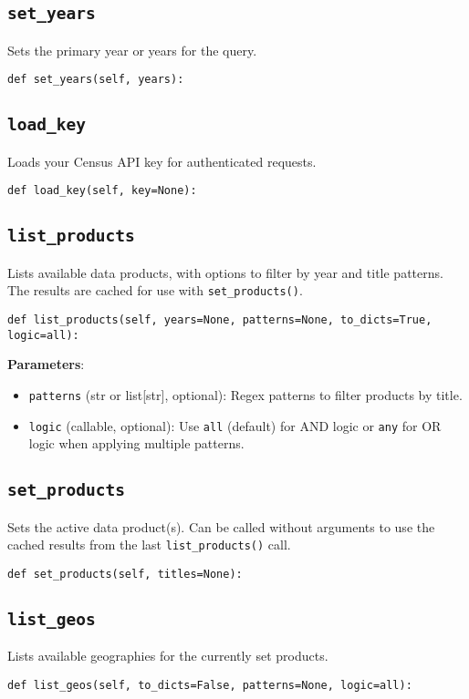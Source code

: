 \documentclass{article}
\begin{document}
\subsection{\texttt{set\_years}}
Sets the primary year or years for the query.
\begin{verbatim}
def set_years(self, years):
\end{verbatim}

\subsection{\texttt{load\_key}}
Loads your Census API key for authenticated requests.
\begin{verbatim}
def load_key(self, key=None):
\end{verbatim}

\subsection{\texttt{list\_products}}
Lists available data products, with options to filter by year and title patterns. The results are cached for use with \texttt{set\_products()}.
\begin{verbatim}
def list_products(self, years=None, patterns=None, to_dicts=True, logic=all):
\end{verbatim}
\textbf{Parameters}:
\begin{itemize}
    \item \texttt{patterns} (str or list[str], optional): Regex patterns to filter products by title.
    \item \texttt{logic} (callable, optional): Use \texttt{all} (default) for AND logic or \texttt{any} for OR logic when applying multiple patterns.
\end{itemize}

\subsection{\texttt{set\_products}}
Sets the active data product(s). Can be called without arguments to use the cached results from the last \texttt{list\_products()} call.
\begin{verbatim}
def set_products(self, titles=None):
\end{verbatim}

\subsection{\texttt{list\_geos}}
Lists available geographies for the currently set products.
\begin{verbatim}
def list_geos(self, to_dicts=False, patterns=None, logic=all):
\end{verbatim}
\end{document}
